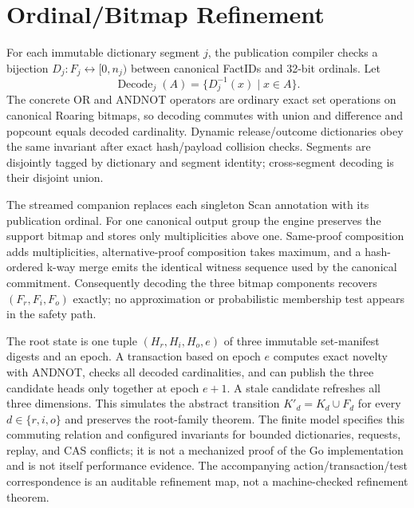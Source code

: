 \documentclass[journal,onecolumn]{IEEEtran}
\newcommand{\code}[1]{\texttt{\detokenize{#1}}}
\begin{document}
\section{Ordinal/Bitmap Refinement}

For each immutable dictionary segment $j$, the publication compiler checks a
bijection $D_j:F_j\leftrightarrow[0,n_j)$ between canonical FactIDs and 32-bit
ordinals. Let
\[
 \operatorname{Decode}_j(A)=\{D_j^{-1}(x)\mid x\in A\}.
\]
The concrete OR and ANDNOT operators are ordinary exact set operations on
canonical Roaring bitmaps, so decoding commutes with union and difference and
popcount equals decoded cardinality. Dynamic release/outcome dictionaries obey
the same invariant after exact hash/payload collision checks. Segments are
disjointly tagged by dictionary and segment identity; cross-segment decoding is
their disjoint union.

The streamed companion replaces each singleton Scan annotation with its
publication ordinal. For one canonical output group the engine preserves the
support bitmap and stores only multiplicities above one. Same-proof
composition adds multiplicities, alternative-proof composition takes maximum,
and a hash-ordered k-way merge emits the identical witness sequence used by the
canonical commitment. Consequently decoding the three bitmap components
recovers $(F_r,F_i,F_o)$ exactly; no approximation or probabilistic membership
test appears in the safety path.

The root state is one tuple $(H_r,H_i,H_o,e)$ of three immutable set-manifest
digests and an epoch. A transaction based on epoch $e$ computes exact novelty
with ANDNOT, checks all decoded cardinalities, and can publish the three
candidate heads only together at epoch $e+1$. A stale candidate refreshes all
three dimensions. This simulates the abstract transition
$K'_d=K_d\cup F_d$ for every $d\in\{r,i,o\}$ and preserves the root-family
theorem. The finite model \code{ExposureBitmapRefinement.tla} specifies this
commuting relation and configured invariants for bounded dictionaries,
requests, replay, and CAS conflicts; it is not a mechanized proof of the Go
implementation and is not itself performance evidence. The accompanying
action/transaction/test correspondence is an auditable refinement map, not a
machine-checked refinement theorem.
\end{document}
